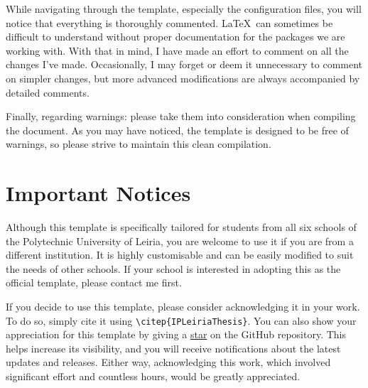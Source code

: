 While navigating through the template, especially the configuration files, you will notice that everything is thoroughly commented. \LaTeX~can sometimes be difficult to understand without proper documentation for the packages we are working with. With that in mind, I have made an effort to comment on all the changes I’ve made. Occasionally, I may forget or deem it unnecessary to comment on simpler changes, but more advanced modifications are always accompanied by detailed comments.

Finally, regarding warnings: please take them into consideration when compiling the document. As you may have noticed, the template is designed to be free of warnings, so please strive to maintain this clean compilation.

\section{Important Notices}
Although this template is specifically tailored for students from all six schools of the Polytechnic University of Leiria, you are welcome to use it if you are from a different institution. It is highly customisable and can be easily modified to suit the needs of other schools. If your school is interested in adopting this as the official template, please contact me first. 

If you decide to use this template, please consider acknowledging it in your work. To do so, simply cite it using \verb|\citep{IPLeiriaThesis}|. You can also show your appreciation for this template by giving a \href{https://github.com/joseareia/ipleiria-thesis/stargazers}{star} on the GitHub repository. This helps increase its visibility, and you will receive notifications about the latest updates and releases. Either way, acknowledging this work, which involved significant effort and countless hours, would be greatly appreciated.